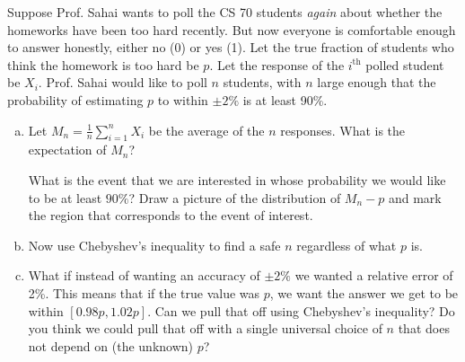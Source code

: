\documentclass[11pt]{article}
\newif\ifsolutions
\begin{document}
\begin{enumerate}
Suppose Prof. Sahai wants to poll the CS 70 students {\em again} about
whether the homeworks have been too hard recently.  But now everyone
is comfortable enough to answer honestly, either no (0) or yes
(1). Let the true fraction of students who think the homework is too
hard be $p$. Let the response of the $i^{\text{th}}$ polled student be
$X_i$.  Prof. Sahai would like to poll $n$ students, with $n$ large
enough that the probability of estimating $p$ to within $\pm 2\% $ is at least 90\%.

\begin{enumerate}[a)]

\item Let $M_n = \frac{1}{n}\sum_{i=1}^n X_i$ be the average of the
  $n$ responses. What is the expectation of $M_n$?  

  What is the event that we are interested in whose probability we
  would like to be at least $90\%$? Draw a picture of the distribution
  of $M_n - p$ and mark the region that corresponds to the event of
  interest. 

\ifsolutions{\color{blue}{
\begin{equation*}
X_i = \begin{cases}
      1 &\mbox{hw is too hard} \\
      0 &\mbox{hw is not too hard}
      \end{cases}
\end{equation*}
$X_i$ is i.i.d Bernoulli r.v. with $\Pr[X_i=1] = p$. So, $M_n \sim \frac{1}{n}Binom(n,p)$:
\[ E[M_n] = \frac{1}{n}\sum_{i=1}^n E[X_i] = \frac{1}{n}\cdot(np) = p\]
We want 
\[ \Pr[|M_n - p| < 0.02p] > 0.9 \]
Or equivalently,
\[ \Pr[|M_n - p| \geq 0.02p] \leq 0.1 \]
}}\fi


\item Now use Chebyshev's inequality to find a safe $n$ regardless of
  what $p$ is. 
\ifsolutions{\color{blue}{
\[ Var[M_n] = \frac{1}{n^2} \sum_{i=1}^n Var[X_i] = \frac{p(1-p)}{n} \]
\[ \Pr[|M_n - p|] \geq 0.02p] \leq \frac{Var[M_n]}{(0.02p)^2} = \frac{1-p}{(0.02)^2np} \leq 0.1 \]
\[ n \geq 25000\frac{1-p}{p}\]
}}\fi

\item What if instead of wanting an accuracy of $\pm 2\%$ we wanted a
  relative error of 2\%. This means that if the true value was $p$, we
  want the answer we get to be within $[0.98 p, 1.02p]$. Can we pull
  that off using Chebyshev's inequality? Do you think we could pull
  that off with a single universal choice of $n$ that does not depend
  on (the unknown) $p$?



\end{enumerate}
\end{enumerate}
\end{document}
